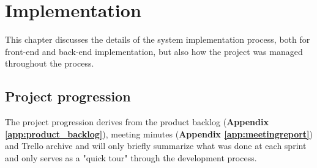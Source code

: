 
\chapter{Implementation}

This chapter discusses the details of the system implementation process, both for front-end and back-end implementation, but also how the project was managed throughout the process.


\section{Project progression}
\label{sec:project_progression}

The project progression derives from the product backlog (\textbf{Appendix \ref{app:product_backlog}}), meeting minutes (\textbf{Appendix \ref{app:meetingreport}}) and Trello archive and will only briefly summarize what was done at each sprint and only serves as a "quick tour" through the development process.

